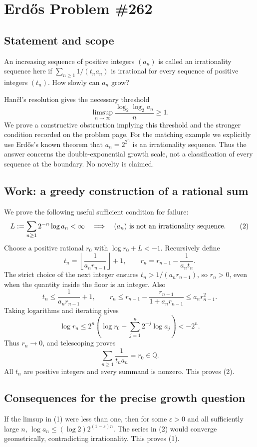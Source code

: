 \section{Erd\H{o}s Problem \#262}
\subsection{Statement and scope}
An increasing sequence of positive integers $(a_n)$ is called an irrationality sequence here if $\sum_{n\ge1}1/(t_na_n)$ is irrational for every sequence of positive integers $(t_n)$. How slowly can $a_n$ grow?

Han\v cl's resolution gives the necessary threshold
\[
 \limsup_{n\to\infty}\frac{\log_2\log_2 a_n}{n}\ge1.
 \tag{1}
\]
We prove a constructive obstruction implying this threshold and the stronger condition recorded on the problem page. For the matching example we explicitly use Erd\H{o}s's known theorem that $a_n=2^{2^n}$ is an irrationality sequence. Thus the answer concerns the double-exponential growth scale, not a classification of every sequence at the boundary. No novelty is claimed.

\subsection{Work: a greedy construction of a rational sum}
We prove the following useful sufficient condition for failure:
\[
 L:=\sum_{n\ge1}2^{-n}\log a_n<\infty
 \quad\Longrightarrow\quad (a_n)\hbox{ is not an irrationality sequence}.
 \tag{2}
\]
Choose a positive rational $r_0$ with $\log r_0+L<-1$. Recursively define
\[
 t_n=\left\lfloor\frac1{a_nr_{n-1}}\right\rfloor+1,
 \qquad r_n=r_{n-1}-\frac1{a_nt_n}.
\]
The strict choice of the next integer ensures $t_n>1/(a_nr_{n-1})$, so $r_n>0$, even when the quantity inside the floor is an integer. Also
\[
 t_n\le\frac1{a_nr_{n-1}}+1,
 \qquad
 r_n\le r_{n-1}-\frac{r_{n-1}}{1+a_nr_{n-1}}
 \le a_nr_{n-1}^2.
\]
Taking logarithms and iterating gives
\[
 \log r_n\le 2^n\left(\log r_0+
                 \sum_{j=1}^n2^{-j}\log a_j\right)<-2^n.
\]
Thus $r_n\to0$, and telescoping proves
\[
 \sum_{n\ge1}\frac1{t_na_n}=r_0\in\mathbb Q.
\]
All $t_n$ are positive integers and every summand is nonzero. This proves (2).

\subsection{Consequences for the precise growth question}
If the limsup in (1) were less than one, then for some $\varepsilon>0$ and all sufficiently large $n$,
$\log a_n\le (\log2)2^{(1-\varepsilon)n}$. The series in (2) would converge geometrically, contradicting irrationality. This proves (1).


